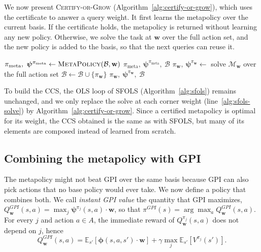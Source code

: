 \documentclass[11pt]{article}
\newcommand{\vphi}{\bm{\phi}}      %
\newcommand{\vpsi}{\bm{\psi}}      %
\begin{document}
We now present \textsc{Certify-or-Grow} (Algorithm~\ref{alg:certify-or-grow}), which uses the certificate to answer a query weight. It first learns the metapolicy over the current basis. If the certificate holds, the metapolicy is returned without learning any new policy. Otherwise, we solve the task at $\mathbf{w}$ over the full action set, and the new policy is added to the basis, so that the next queries can reuse it.

\begin{algorithm}[H]
\caption{\textsc{Certify-or-Grow}$(\mathbf{w},\mathcal{B})$}\label{alg:certify-or-grow}
\begin{algorithmic}[1]
\State $\pi_{\mathrm{meta}},\ \vpsi^{\pi_{\mathrm{meta}}} \gets \textsc{MetaPolicy}(\mathcal{B}, \mathbf{w})$ 
 
    \State \Return $\pi_{\mathrm{meta}},\ \vpsi^{\pi_{\mathrm{meta}}},\ \mathcal{B}$
\Else
    \State $\pi_{\mathbf{w}},\ \vpsi^{\pi_{\mathbf{w}}} \gets$ solve $\mathcal{M}_{\mathbf{w}}$ over the full action set \label{alg:cog-fallback}
    \State $\mathcal{B}\gets\mathcal{B}\cup\{\pi_{\mathbf{w}}\}$
    \State \Return $\pi_{\mathbf{w}},\ \vpsi^{\pi_{\mathbf{w}}},\ \mathcal{B}$
\EndIf
\end{algorithmic}
\end{algorithm}

To build the CCS, the OLS loop of SFOLS (Algorithm~\ref{alg:sfols}) remains unchanged, and we only replace the solve at each corner weight (line~\ref{alg:sfols-solve}) by Algorithm~\ref{alg:certify-or-grow}. Since a certified metapolicy is optimal for its weight, the CCS obtained is the same as with SFOLS, but many of its elements are composed instead of learned from scratch.

\subsection{Combining the metapolicy with GPI}\label{sec:hyb}

The metapolicy might not beat GPI over the same basis because GPI can also pick actions that no base policy would ever take. We now define a policy that combines both. We call \textit{instant GPI value} the quantity that GPI maximizes, $Q^{GPI}_{\mathbf{w}}(s,a) = \max_j \vpsi^{\pi_j}(s,a) \cdot \mathbf{w}$, so that $\pi^{GPI}(s) = \arg\max_a Q^{GPI}_{\mathbf{w}}(s,a)$. For every $j$ and action $a \in A$, the immediate reward of $Q^{\pi_j}_{\mathbf{w}}(s,a)$ does not depend on $j$, hence
\begin{equation}\label{eq:gpi-decomposition}
    Q^{GPI}_{\mathbf{w}}(s,a) = \mathbb{E}_{s'}\left[ \vphi(s,a,s') \cdot \mathbf{w} \right] + \gamma \max_j \mathbb{E}_{s'}\left[ V^{\pi_j}(s') \right].
\end{equation}
\end{document}

